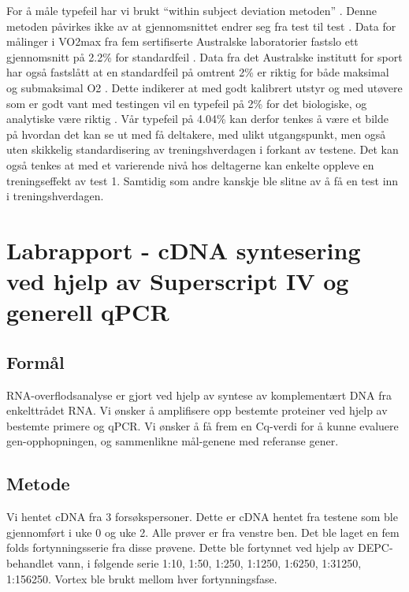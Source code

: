 \documentclass[
]{book}
\begin{document}
For å måle typefeil har vi brukt ``within subject deviation metoden'' \citep{hopkins2000} . Denne metoden påvirkes ikke av at gjennomsnittet endrer seg fra test til test \citep{hopkins2000}. Data for målinger i VO2max fra fem sertifiserte Australske laboratorier fastslo ett gjennomsnitt på 2.2\% for standardfeil \citep{halperin2015}. Data fra det Australske institutt for sport har også fastslått at en standardfeil på omtrent 2\% er riktig for både maksimal og submaksimal O2 \citep{clark2007, robertson2010, saunders2009}. Dette indikerer at med godt kalibrert utstyr og med utøvere som er godt vant med testingen vil en typefeil på 2\% for det biologiske, og analytiske være riktig \citep{halperin2015}. Vår typefeil på 4.04\% kan derfor tenkes å være et bilde på hvordan det kan se ut med få deltakere, med ulikt utgangspunkt, men også uten skikkelig standardisering av treningshverdagen i forkant av testene. Det kan også tenkes at med et varierende nivå hos deltagerne kan enkelte oppleve en treningseffekt av test 1. Samtidig som andre kanskje ble slitne av å få en test inn i treningshverdagen.

\hypertarget{labrapport---cdna-syntesering-ved-hjelp-av-superscript-iv-og-generell-qpcr}{%
\chapter{Labrapport - cDNA syntesering ved hjelp av Superscript IV og generell qPCR}\label{labrapport---cdna-syntesering-ved-hjelp-av-superscript-iv-og-generell-qpcr}}

\hypertarget{formuxe5l}{%
\section{Formål}\label{formuxe5l}}

RNA-overflodsanalyse er gjort ved hjelp av syntese av komplementært DNA fra enkelttrådet RNA. Vi ønsker å amplifisere opp bestemte proteiner ved hjelp av bestemte primere og qPCR. Vi ønsker å få frem en Cq-verdi for å kunne evaluere gen-opphopningen, og sammenlikne mål-genene med referanse gener.

\hypertarget{metode-1}{%
\section{Metode}\label{metode-1}}

Vi hentet cDNA fra 3 forsøkspersoner. Dette er cDNA hentet fra testene som ble gjennomført i uke 0 og uke 2. Alle prøver er fra venstre ben. Det ble laget en fem folds fortynningsserie fra disse prøvene. Dette ble fortynnet ved hjelp av DEPC-behandlet vann, i følgende serie 1:10, 1:50, 1:250, 1:1250, 1:6250, 1:31250, 1:156250. Vortex ble brukt mellom hver fortynningsfase.
\end{document}
